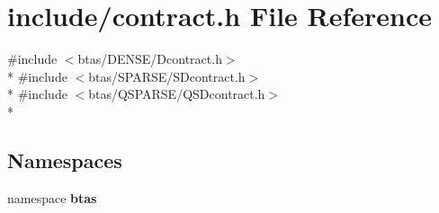 \section{include/contract.h File Reference}
\label{dd/d9c/contract_8h}
{\ttfamily \#include $<$btas/\-D\-E\-N\-S\-E/\-Dcontract.\-h$>$}\\*
{\ttfamily \#include $<$btas/\-S\-P\-A\-R\-S\-E/\-S\-Dcontract.\-h$>$}\\*
{\ttfamily \#include $<$btas/\-Q\-S\-P\-A\-R\-S\-E/\-Q\-S\-Dcontract.\-h$>$}\\*
\subsection*{Namespaces}
\begin{DoxyCompactItemize}
\item 
namespace {\bf btas}
\end{DoxyCompactItemize}
